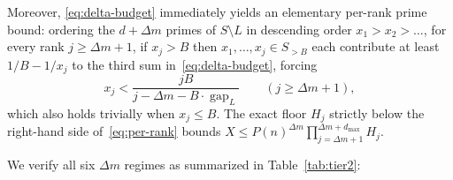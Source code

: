 \documentclass[11pt]{article}
\theoremstyle{remark}
\newcommand{\gap}{\operatorname{gap}}
\begin{document}
Moreover, \eqref{eq:delta-budget} immediately yields an elementary per-rank
prime bound: ordering the $d + \Delta m$ primes of $S \setminus L$ in descending
order $x_1 > x_2 > \dots$, for every rank $j \ge \Delta m + 1$, if $x_j > B$
then $x_1,\dots,x_j \in S_{>B}$ each contribute at least $1/B - 1/x_j$ to the
third sum in~\eqref{eq:delta-budget}, forcing
\begin{equation}\label{eq:per-rank}
  x_j < \frac{j B}{j - \Delta m - B\cdot\gap_L}
  \qquad (j \ge \Delta m + 1),
\end{equation}
which also holds trivially when $x_j \le B$. The exact floor $H_j$ strictly
below the right-hand side of~\eqref{eq:per-rank} bounds
$X \le P(n)^{\Delta m}\prod_{j=\Delta m+1}^{\Delta m + d_{\max}} H_j$.

We verify all six $\Delta m$ regimes as summarized in Table~\ref{tab:tier2}:
\end{document}
